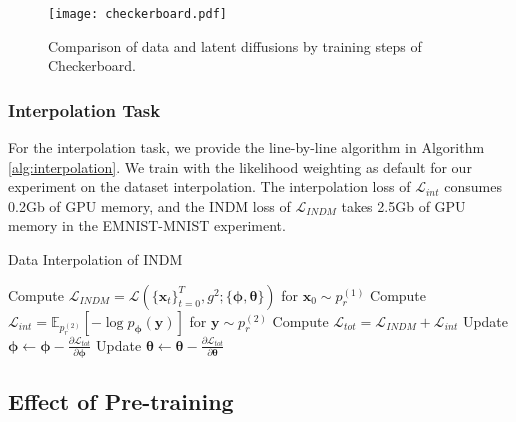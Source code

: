 \documentclass{article}
\theoremstyle{definition}
\theoremstyle{remark}
\begin{document}
	\begin{figure}[t]
		\centering
		\texttt{[image: checkerboard.pdf]}
		\caption{Comparison of data and latent diffusions by training steps of Checkerboard.}
		\label{fig:checkerboard}
	\end{figure}
	
	\subsubsection{Interpolation Task}\label{appendix:interpolation__}
	
	For the interpolation task, we provide the line-by-line algorithm in Algorithm \ref{alg:interpolation}. We train with the likelihood weighting as default for our experiment on the dataset interpolation. The interpolation loss of $\mathcal{L}_{int}$ consumes 0.2Gb of GPU memory, and the INDM loss of $\mathcal{L}_{INDM}$ takes 2.5Gb of GPU memory in the EMNIST-MNIST experiment.
	\begingroup
	\renewcommand\thealgorithm{2}
	\begin{algorithm}[H]
		\centering
		\caption{Data Interpolation of INDM}\label{alg:interpolation}
		\begin{algorithmic}[1]
			\Repeat
			\State Compute $\mathcal{L}_{INDM}=\mathcal{L}(\{\mathbf{x}_{t}\}_{t=0}^{T}, g^{2};\{\bm{\phi},\bm{\theta}\})$ for $\mathbf{x}_{0}\sim p_{r}^{(1)}$
			\State Compute $\mathcal{L}_{int}=\mathbb{E}_{p_{r}^{(2)}}[-\log{p_{\bm{\phi}}(\mathbf{y})}]$ for $\mathbf{y}\sim p_{r}^{(2)}$
			\State Compute $\mathcal{L}_{tot}=\mathcal{L}_{INDM}+\mathcal{L}_{int}$
			\State Update $\bm{\phi}\leftarrow \bm{\phi}-\frac{\partial\mathcal{L}_{tot}}{\partial\bm{\phi}}$
			\State Update $\bm{\theta}\leftarrow \bm{\theta}-\frac{\partial\mathcal{L}_{tot}}{\partial\bm{\theta}}$
		\end{algorithmic}
	\end{algorithm}
	\endgroup
	
	\subsection{Effect of Pre-training}\label{appendix:pretraining}
	
\end{document}
